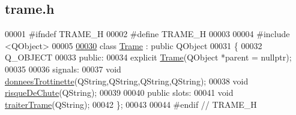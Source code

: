 \hypertarget{trame_8h_source}{}\subsection{trame.\+h}
\label{trame_8h_source}

\begin{DoxyCode}
00001 \textcolor{preprocessor}{#ifndef TRAME\_H}
00002 \textcolor{preprocessor}{#define TRAME\_H}
00003 
00004 \textcolor{preprocessor}{#include <QObject>}
00005 
\hyperlink{class_trame}{00030} \textcolor{keyword}{class }\hyperlink{class_trame}{Trame} : \textcolor{keyword}{public} QObject
00031 \{
00032     Q\_OBJECT
00033 \textcolor{keyword}{public}:
00034     \textcolor{keyword}{explicit} \hyperlink{class_trame_ae40bffc8a1e3f6ad9dec4710b673a57a}{Trame}(QObject *parent = \textcolor{keyword}{nullptr}); 
00035 
00036 signals:
00037     \textcolor{keywordtype}{void} \hyperlink{class_trame_ae7f5191744273a6bb4347aa477bdfaff}{donneesTrottinette}(QString,QString,QString,QString); 
00038     \textcolor{keywordtype}{void} \hyperlink{class_trame_a8286aea8fb78e2e148f3f0dc35e8b079}{risqueDeChute}(QString);
00039 
00040 \textcolor{keyword}{public} slots:
00041     \textcolor{keywordtype}{void} \hyperlink{class_trame_af6397dc6452101d13d8cccd53205a937}{traiterTrame}(QString); 
00042 \};
00043 
00044 \textcolor{preprocessor}{#endif // TRAME\_H}
\end{DoxyCode}
